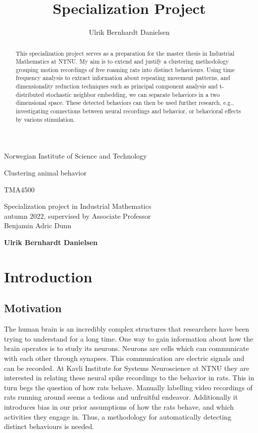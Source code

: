 \documentclass[a4paper, 10pt]{memoir}
\title{Specialization Project}
\author{Ulrik Bernhardt Danielsen}
\theoremstyle{plain}
\theoremstyle{definition}
\theoremstyle{remark}
\newlength{\tpheight}\setlength{\tpheight}{0.9\textheight}
\newlength{\txtheight}\setlength{\txtheight}{0.9\tpheight}
\newlength{\drop}
\newcommand*{\titleMS}{\begingroup%
\drop=0.1\txtheight
\vspace*{\drop}
\centering 
{\LARGE Norwegian Institute of Science and Technology}\\[2\baselineskip]
{\LARGE\sffamily Clustering animal behavior \par}
\vfill
{\LARGE TMA4500}\par
\vspace{\drop}
{\large Specialization project in Industrial Mathematics \\
        autumn 2022, supervised by Associate Professor  \\
        Benjamin Adric Dunn\par}
\vfill
{\large\bfseries Ulrik Bernhardt Danielsen}\par
\vspace*{\drop}
\endgroup}
\begin{document}
\begin{titlingpage}
\titleMS
\end{titlingpage}

\tableofcontents*
\clearpage
\listoffigures*
\clearpage

\lhead{}
\rhead{}
\begin{abstract}
        This specialization project serves as a preparation for the master thesis in Industrial Mathematics at NTNU. 
        My aim is to extend and justify a clustering methodology grouping motion recordings of free roaming rats into distinct behaviours.
        Using time frequency analysis to extract information about repeating movement patterns, and dimensionality reduction techniques such as principal component analysis and t-distributed stochastic neighbor embedding, we can separate behaviors in a two dimensional space.
        These detected behaviors can then be used further research, e.g., investigating connections between neural recordings and behavior, or behavioral effects by various stimulation.
\end{abstract}



\chapter{Introduction}
\lhead{\rightmark}
\rhead{\leftmark}
\section{Motivation}
The human brain is an incredibly complex structures that researchers have been trying to understand for a long time.
One way to gain information about how the brain operates is to study its neurons.
Neurons are cells which can communicate with each other through synapses.
This communication are electric signals and can be recorded.
At Kavli Institute for Systems Neuroscience at NTNU they are interested in relating these neural spike recordings to the behavior in rats.
This in turn begs the question of how rats behave.
Manually labelling video recordings of rats running around seems a tedious and unfruitful endeavor.
Additionally it introduces bias in our prior assumptions of how the rats behave, and which activities they engage in.
Thus, a methodology for automatically detecting distinct behaviours is needed.
\end{document}
